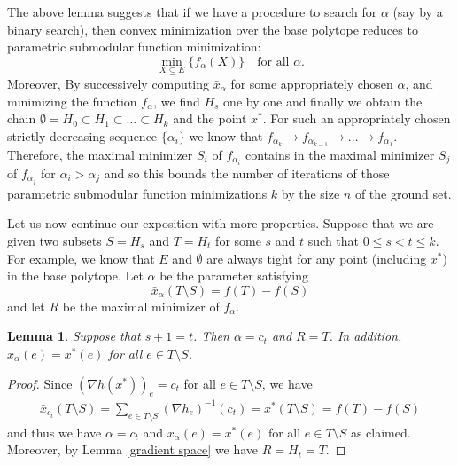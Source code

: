 \documentclass{article}
\newtheorem{lemma}{Lemma}
\begin{document}
The above lemma suggests that if we have a procedure to search for $\alpha$ (say by a binary search), then convex minimization over the base polytope reduces to parametric submodular function minimization:
\begin{equation}\label{prob param}
    \min_{X \subseteq E} \{f_\alpha (X)\} \quad \text{for all $\alpha$}.
\end{equation}
Moreover, By successively computing $\bar{x}_\alpha$ for some appropriately chosen $\alpha$, and minimizing the function $f_\alpha$, we find $H_s$ one by one and finally we obtain the chain $ \emptyset = H_0 \subset H_1 \subset \dots \subset H_k$ and the point $x^*$. For such an appropriately chosen strictly decreasing sequence $\{\alpha_i\}$ we know that $f_{\alpha_k} \to f_{\alpha_{k-1}} \to \dots \to f_{\alpha_1}$. Therefore, the maximal minimizer $S_i$ of $f_{\alpha_i}$ contains in the maximal minimizer $S_j$ of $f_{\alpha_j}$ for $\alpha_i > \alpha_j$ and so this bounds the number of iterations of those paramtetric submodular function minimizations $k$ by the size $n$ of the ground set.

Let us now continue our exposition with more properties. Suppose that we are given two subsets $S = H_s$ and $T = H_t$ for some $s$ and
$t$ such that $0 \leq s < t \leq k$. For example, we know that $E$ and $\emptyset$ are always tight for any point (including $x^*$) in the base polytope. Let $\alpha$ be the parameter satisfying 
\begin{equation*}
    \bar{x}_\alpha (T \setminus S) = f (T ) - f (S)
\end{equation*}
and let $R$ be the maximal minimizer of $f_{\alpha}$.

\begin{lemma} \label{gradient 1}
Suppose that $s + 1 = t$. Then $\alpha = c_t$ and $R=T$. In addition, $\bar{x}_\alpha(e) = x^*(e)$ for all $e \in T\setminus S$.
\end{lemma}
\begin{proof}
Since $(\nabla h(x^*))_e = c_t$ for all $e \in T\setminus S$, we have
\begin{align*}
    \bar{x}_{c_t}(T\setminus S) = \sum_{e \in T\setminus S} (\nabla h_e)^{-1}(c_t) = x^*(T \setminus S) = f(T) - f(S)
\end{align*}
and thus we have $\alpha = c_t$ and $\bar{x}_\alpha(e) = x^*(e)$ for all $e \in T\setminus S$ as claimed. Moreover, by Lemma \ref{gradient space} we have $R = H_t = T$.
\end{proof}
\end{document}
